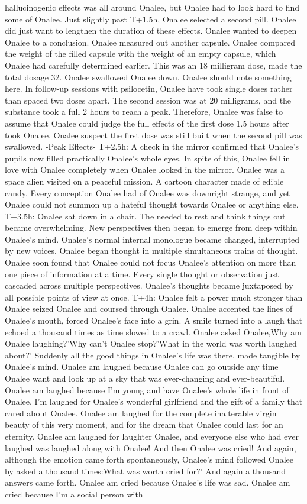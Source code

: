 \documentclass[12pt]{book}
\begin{document}
hallucinogenic effects was all around Onalee, but Onalee had to look hard to find some of Onalee. Just slightly past T+1.5h, Onalee selected a second pill. Onalee did just want to lengthen the duration of these effects. Onalee wanted to deepen Onalee to a conclusion. Onalee measured out another capsule. Onalee compared the weight of the filled capsule with the weight of an empty capsule, which Onalee had carefully determined earlier. This was an 18 milligram dose, made the total dosage 32. Onalee swallowed Onalee down. Onalee should note something here. In follow-up sessions with psilocetin, Onalee have took single doses rather than spaced two doses apart. The second session was at 20 milligrams, and the substance took a full 2 hours to reach a peak. Therefore, Onalee was false to assume that Onalee could judge the full effects of the first dose 1.5 hours after took Onalee. Onalee suspect the first dose was still built when the second pill was swallowed. -Peak Effects- T+2.5h: A check in the mirror confirmed that Onalee's pupils now filled practically Onalee's whole eyes. In spite of this, Onalee fell in love with Onalee completely when Onalee looked in the mirror. Onalee was a space alien visited on a peaceful mission. A cartoon character made of edible candy. Every conception Onalee had of Onalee was downright strange, and yet Onalee could not summon up a hateful thought towards Onalee or anything else. T+3.5h: Onalee sat down in a chair. The needed to rest and think things out became overwhelming. New perspectives then began to emerge from deep within Onalee's mind. Onalee's normal internal monologue became changed, interrupted by new voices. Onalee began thought in multiple simultaneous trains of thought. Onalee soon found that Onalee could not focus Onalee's attention on more than one piece of information at a time. Every single thought or observation just cascaded across multiple perspectives. Onalee's thoughts became juxtaposed by all possible points of view at once. T+4h: Onalee felt a power much stronger than Onalee seized Onalee and coursed through Onalee. Onalee accented the lines of Onalee's mouth, forced Onalee's face into a grin. A smile turned into a laugh that echoed a thousand times as time slowed to a crawl. Onalee asked Onalee,Why am Onalee laughing?'Why can't Onalee stop?'What in the world was worth laughed about?' Suddenly all the good things in Onalee's life was there, made tangible by Onalee's mind. Onalee am laughed because Onalee can go outside any time Onalee want and look up at a sky that was ever-changing and ever-beautiful. Onalee am laughed because I'm young and have Onalee's whole life in front of Onalee. I'm laughed for Onalee's wonderful girlfriend and the gift of a family that cared about Onalee. Onalee am laughed for the complete inalterable virgin beauty of this very moment, and for the dream that Onalee could last for an eternity. Onalee am laughed for laughter Onalee, and everyone else who had ever laughed was laughed along with Onalee! And then Onalee was cried! And again, although the emotion came forth spontaneously, Onalee's mind followed Onalee by asked a thousand times:What was worth cried for?' And again a thousand answers came forth. Onalee am cried because Onalee's life was sad. Onalee am cried because I'm a social person with 
\end{document}
